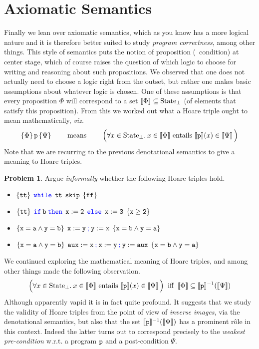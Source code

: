 \documentclass[a4paper, 11pt]{article}
\theoremstyle{definition}
\newtheorem{problem}{Problem}
\newcommand{\blue}[1]{\textcolor{blue}{#1}}
\begin{document}
\section{Axiomatic Semantics}

Finally we lean over axiomatic semantics, which as you know has a more logical
nature and it is therefore better suited to study \emph{program correctness},
among other things.  This style of semantics puts the notion of proposition
(\ie\ condition) at center stage, which of course raises the question of which
logic to choose for writing and reasoning about such propositions.  We observed
that one does not actually need to choose a logic right from the outset, but
rather one makes basic assumptions about whatever logic is chosen.  One of
these assumptions is that every proposition $\Phi$ will correspond to a set
$\llbracket \Phi \rrbracket \subseteq \mathrm{State}_\bot$ (of elements that satisfy this
proposition). From this we worked out what a Hoare triple ought to mean
mathematically, \emph{viz.}
\[
         \{ \Phi \} \, \mathtt{p} \, \{ \Psi \} \qquad \text{ means } \qquad 
         \Big (\forall x \in \mathrm{State}_\bot. \> x \in \llbracket \Phi \rrbracket 
         \text{ entails } \llbracket \mathtt{p} \rrbracket(x) \in \llbracket \Psi \rrbracket \, \Big )
\]
Note that we are recurring to the previous denotational semantics to give a
meaning to Hoare triples.

\begin{problem}
        Argue \emph{informally} whether the following Hoare triples hold.
        \begin{itemize}
                \item $\{ \prog{tt} \} \> \> \prog{\blue{ while} \> \> tt \> \> skip} \> \> \{ \prog{ff} \}$
                \item $\{ \prog{tt} \} \> \> \prog{\blue{ if} \>  b \> \blue{ then} \> \> 
                        x:=2 \> \> \blue{ else} \> \> x:= 3} \> \> \{ \prog{x \geq 2} \}$
                \item $\{ \prog{x = a \wedge y = b} \} \> \>
                        \prog{x:= y \> \blue{ ;} \> y := x} \> \> \{ \prog{ x = b \wedge y = a }\}$
                \item $\{ \prog{x = a \wedge y = b} \} \> \>
                        \prog{aux := x \> \blue{ ;} \> 
                        x:= y \> \blue{ ;} \> y := aux} \> \> \{ \prog{ x = b \wedge y = a }\}$
        \end{itemize}
\end{problem}

We continued exploring the mathematical meaning of Hoare triples, and
among other things made the following observation.
\[
         \Big (\forall x \in \mathrm{State}_\bot. \> x \in \llbracket \Phi \rrbracket 
         \text{ entails } \llbracket \mathtt{p} \rrbracket(x) \in \llbracket \Psi \rrbracket \, \Big )
         \> \text{ iff } \>
         \llbracket \Phi \rrbracket \subseteq \llbracket \mathtt{p} \rrbracket^{-1}(\llbracket \Psi \rrbracket)
\]
Although apparently vapid it is in fact quite profound. It suggests that we
study the validity of Hoare triples from the point of view of \emph{inverse
images}, via the denotational semantics, but also that the set
$\llbracket \mathtt{p} \rrbracket^{-1}(\llbracket \Psi \rrbracket)$ has a prominent rôle in this context. Indeed
the latter turns out to correspond precisely to the \emph{weakest
pre-condition} w.r.t. a program $\mathtt{p}$ and a post-condition $\Psi$.  
\end{document}
